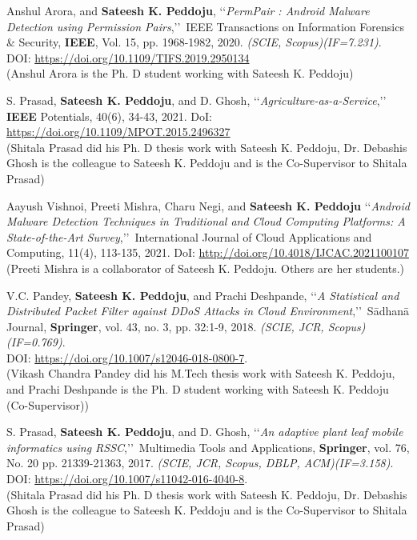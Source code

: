\begin{etaremune}
	\item
	Anshul Arora, and \textbf{Sateesh K. Peddoju}, \lq\lq \textit{PermPair :  Android Malware Detection using Permission Pairs},\rq\rq\, IEEE Transactions on Information Forensics \& Security, \textbf{IEEE}, Vol. 15, pp. 1968-1982, 2020. \emph{(SCIE, Scopus)(IF=7.231)}. \\DOI: \url{https://doi.org/10.1109/TIFS.2019.2950134}  \\(Anshul Arora is the Ph. D student working with Sateesh K. Peddoju)

	\item
	S. Prasad, \textbf{Sateesh K. Peddoju}, and D. Ghosh, \lq\lq \textit{Agriculture-as-a-Service},\rq\rq\, {\textbf{IEEE} Potentials}, 40(6), 34-43, 2021. DoI: \url{https://doi.org/10.1109/MPOT.2015.2496327}  \\(Shitala Prasad did his Ph. D thesis work with Sateesh K. Peddoju, Dr. Debashis Ghosh is the colleague to Sateesh K. Peddoju and is the Co-Supervisor to Shitala Prasad)

 	\item
	Aayush Vishnoi, Preeti Mishra, Charu Negi, and \textbf{Sateesh K. Peddoju} \lq\lq \textit{Android Malware Detection Techniques in Traditional and Cloud Computing Platforms: A State-of-the-Art Survey},\rq\rq\, {International Journal of Cloud Applications and Computing}, 11(4), 113-135, 2021. DoI: \url{http://doi.org/10.4018/IJCAC.2021100107}  \\(Preeti Mishra is a collaborator of Sateesh K. Peddoju. Others are her students.)
 
	\item
	V.C. Pandey, \textbf{Sateesh K. Peddoju}, and Prachi Deshpande, \lq\lq \textit{A Statistical and Distributed Packet Filter against DDoS Attacks in Cloud Environment},\rq\rq\, S{\={a}}dhan{\={a}} Journal, \textbf{Springer}, vol. 43, no. 3, pp. 32:1-9, 2018. \emph{(SCIE, JCR, Scopus)(IF=0.769)}. \\DOI: \url{https://doi.org/10.1007/s12046-018-0800-7}.  \\(Vikash Chandra Pandey did his M.Tech thesis work with Sateesh K. Peddoju, and Prachi Deshpande is the Ph. D student working with Sateesh K. Peddoju (Co-Supervisor))
	
	\item
	S. Prasad, \textbf{Sateesh K. Peddoju}, and D. Ghosh, \lq\lq \textit{An adaptive plant leaf mobile informatics using RSSC},\rq\rq\, Multimedia Tools and Applications, \textbf{Springer}, vol. 76, No. 20 pp. 21339-21363, 2017. \emph{(SCIE, JCR, Scopus, DBLP, ACM)(IF=3.158)}. \\DOI: \url{https://doi.org/10.1007/s11042-016-4040-8}.  \\(Shitala Prasad did his Ph. D thesis work with Sateesh K. Peddoju, Dr. Debashis Ghosh is the colleague to Sateesh K. Peddoju and is the Co-Supervisor to Shitala Prasad)
	

\end{etaremune}
